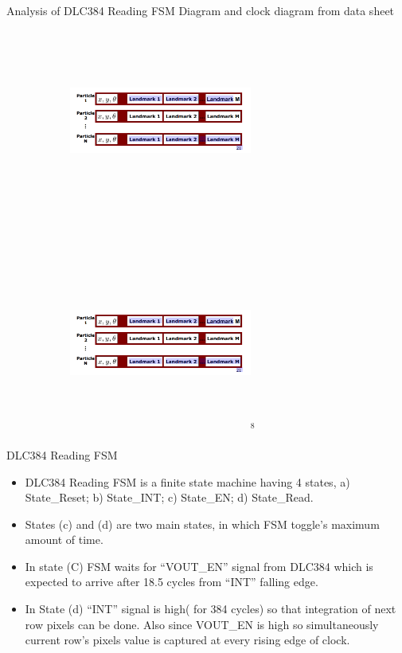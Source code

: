 \documentclass{beamer}
\begin{document}
\begin{frame}{Analysis of DLC384 Reading FSM Diagram and clock diagram from data sheet}
     \begin{figure}
     \centering
        \begin{subfigure}[b]{0.4\textwidth}
        \hspace*{-10mm}
        \includegraphics[height = 60mm,width = 60mm]{RBPF_SLAM.png}
        \end{subfigure}
    ~
        \begin{subfigure}[b]{0.4\textwidth}
        \centering
        \includegraphics[height = 60mm,width = 60mm]{RBPF_SLAM.png}$^{8}$
        \end{subfigure}
    \end{figure}   
\end{frame}


\begin{frame}{DLC384 Reading FSM}
     \begin{itemize}
         \item DLC384 Reading FSM is a finite state machine having 4 states, a) State\_Reset; b) State\_INT; c) State\_EN; d) State\_Read.
         \item States (c) and (d) are two main states, in which FSM toggle’s maximum amount of time.
         \item In state (C) FSM waits for “VOUT\_EN” signal from DLC384 which is expected to arrive after 18.5 cycles from “INT” falling edge.
         \item In State (d) “INT” signal is high( for 384 cycles) so that integration of next row pixels can be done. Also since VOUT\_EN is high so simultaneously current row’s pixels value is captured at every rising edge of clock.
     \end{itemize}
\end{frame}
\end{document}
